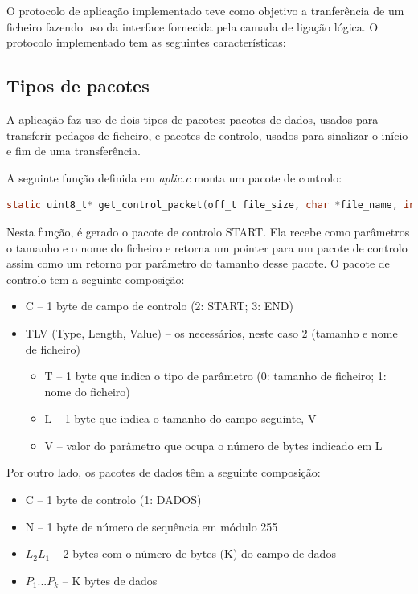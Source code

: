 \documentclass[a4paper,11pt,portuguese]{article}
\begin{document}
    O protocolo de aplicação implementado teve como objetivo a tranferência de um ficheiro fazendo uso
    da interface fornecida pela camada de ligação lógica. O protocolo implementado tem as seguintes
    características:

    \subsection{Tipos de pacotes}
    A aplicação faz uso de dois tipos de pacotes: pacotes de dados, usados para transferir pedaços de ficheiro,
    e pacotes de controlo, usados para sinalizar o início e fim de uma transferência.
    
    \noindent A seguinte função definida em
    \textit{aplic.c} monta um pacote de controlo:

\begin{lstlisting}[language=C]
static uint8_t* get_control_packet(off_t file_size, char *file_name, int file_name_size, int *length);
\end{lstlisting}

    Nesta função, é gerado o pacote de controlo START. Ela recebe como parâmetros o tamanho e o nome
    do ficheiro e retorna um pointer para um pacote de controlo assim como um retorno por parâmetro
    do tamanho desse pacote. O pacote de controlo tem a seguinte composição:

    \begin{itemize}
        \item C -- 1 byte de campo de controlo (2: START; 3: END)
        \item TLV (Type, Length, Value) -- os necessários, neste caso 2 (tamanho e nome de ficheiro)
            \begin{itemize}
                \item T -- 1 byte que indica o tipo de parâmetro (0: tamanho de ficheiro; 1: nome do ficheiro)
                \item L -- 1 byte que indica o tamanho do campo seguinte, V
                \item V -- valor do parâmetro que ocupa o número de bytes indicado em L
            \end{itemize}
    \end{itemize}

    \hfill \break
    \noindent Por outro lado, os pacotes de dados têm a seguinte composição:

    \begin{itemize} \label{pacotesdados}
        \item C -- 1 byte de controlo (1: DADOS)
        \item N -- 1 byte de número de sequência em módulo 255
        \item $L_2L_1$ -- 2 bytes com o número de bytes (K) do campo de dados
        \item $P_1...P_k$ -- K bytes de dados
    \end{itemize}
\end{document}
